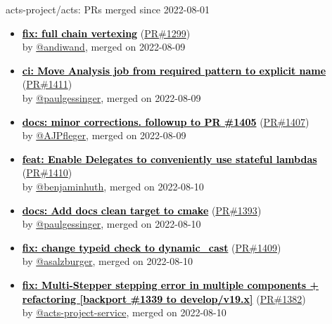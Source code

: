 \begin{frame}[allowframebreaks]{ acts-project/acts: PRs merged since 2022-08-01 }
\begin{itemize}
    \item
    \textbf{\href{https://github.com/acts-project/acts/pull/1299}{\textcolor{black}{fix: full chain vertexing}}}
    (\href{https://github.com/acts-project/acts/pull/1299}{PR\#1299}) \\
    by \href{https://github.com/andiwand}{ @andiwand}, merged on 2022-08-09

    \item
    \textbf{\href{https://github.com/acts-project/acts/pull/1411}{\textcolor{black}{ci: Move Analysis job from required pattern to explicit name}}}
    (\href{https://github.com/acts-project/acts/pull/1411}{PR\#1411}) \\
    by \href{https://github.com/paulgessinger}{ @paulgessinger}, merged on 2022-08-09

    \item
    \textbf{\href{https://github.com/acts-project/acts/pull/1407}{\textcolor{black}{docs: minor corrections. followup to PR \#1405}}}
    (\href{https://github.com/acts-project/acts/pull/1407}{PR\#1407}) \\
    by \href{https://github.com/AJPfleger}{ @AJPfleger}, merged on 2022-08-09

    \item
    \textbf{\href{https://github.com/acts-project/acts/pull/1410}{\textcolor{black}{feat: Enable Delegates to conveniently use stateful lambdas}}}
    (\href{https://github.com/acts-project/acts/pull/1410}{PR\#1410}) \\
    by \href{https://github.com/benjaminhuth}{ @benjaminhuth}, merged on 2022-08-10

    \item
    \textbf{\href{https://github.com/acts-project/acts/pull/1393}{\textcolor{black}{docs: Add docs clean target to cmake}}}
    (\href{https://github.com/acts-project/acts/pull/1393}{PR\#1393}) \\
    by \href{https://github.com/paulgessinger}{ @paulgessinger}, merged on 2022-08-10

    \item
    \textbf{\href{https://github.com/acts-project/acts/pull/1409}{\textcolor{black}{fix: change typeid check to dynamic\_cast}}}
    (\href{https://github.com/acts-project/acts/pull/1409}{PR\#1409}) \\
    by \href{https://github.com/asalzburger}{ @asalzburger}, merged on 2022-08-10

    \item
    \textbf{\href{https://github.com/acts-project/acts/pull/1382}{\textcolor{black}{fix: Multi-Stepper stepping error in multiple components + refactoring [backport \#1339 to develop/v19.x]}}}
    (\href{https://github.com/acts-project/acts/pull/1382}{PR\#1382}) \\
    by \href{https://github.com/acts-project-service}{ @acts-project-service}, merged on 2022-08-10


\end{itemize}
\end{frame}
